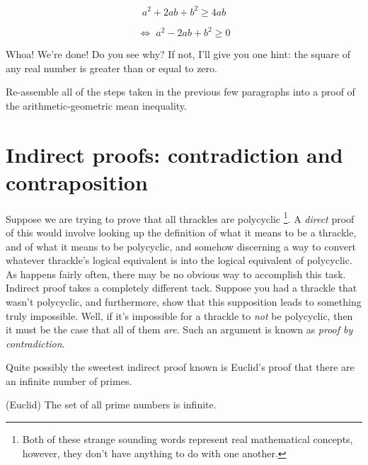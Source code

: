 \[  a^2+2ab+b^2 \geq 4ab \] 

\[ \iff \; a^2-2ab+b^2 \geq 0 \] 

Whoa!  We're done!  Do you see why?  If not, I'll give you one
hint:  the square of any real number is greater than or equal to
zero.

\begin{exer} 
Re-assemble all of the steps taken in the previous few paragraphs
into a proof of the arithmetic-geometric mean inequality.
\end{exer}

 
\clearpage




\newpage

\section[Contradiction and contraposition]{Indirect proofs: contradiction and contraposition}
\label{sec:contra}

Suppose we are trying to prove that all thrackles are polycyclic
\footnote{Both of these strange sounding words represent real 
mathematical concepts, however, they don't have anything to do 
with one another.}.
A {\em direct} proof of this would involve looking up the definition
of what it means to be a thrackle, and of what it means to be polycyclic,
and somehow discerning a way to convert whatever thrackle's logical equivalent
is into the logical equivalent of polycyclic.  As happens fairly often,
there may be no obvious way to accomplish this task.  
Indirect proof takes 
a completely different tack.  Suppose you had a thrackle that wasn't 
polycyclic, and furthermore, show that this supposition leads to something
truly impossible.  Well, if it's impossible for a thrackle to {\em not} be
polycyclic, then it must be the case that all of them {\em are}. 
Such an argument is known as 
\emph{proof by contradiction}.

Quite possibly the sweetest indirect proof known is Euclid's proof that there
are an infinite number of primes.  

\begin{thm} (Euclid) The set of all prime numbers is infinite.
\end{thm}

